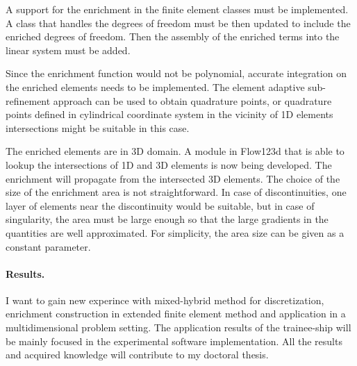 \documentclass{sna}
\begin{document}
A support for the enrichment in the finite element classes must be implemented. A class that handles the 
degrees of freedom must be then updated to include the enriched degrees of freedom. 
Then the assembly of the enriched terms into the linear system must be added.

Since the enrichment function would not be polynomial, accurate integration on the enriched elements needs to
be implemented. The element adaptive sub-refinement approach can be used to obtain quadrature points, 
or quadrature points defined in cylindrical coordinate system in the vicinity of 1D elements intersections
might be suitable in this case.

The enriched elements are in 3D domain. A module in Flow123d that is able to lookup the intersections
of 1D and 3D elements is now being developed. The enrichment will propagate from the intersected 3D elements.
The choice of the size of the enrichment area is not straightforward. In case of discontinuities, one layer of elements
near the discontinuity would be suitable, but in case of singularity, the area must be large enough so that 
the large gradients in the quantities are well approximated. For simplicity, the area size can be given as
a constant parameter.



\paragraph{Results.}
I want to gain new experince with mixed-hybrid method for discretization, 
enrichment construction in extended finite element method and application in a multidimensional problem setting.
The application results of the trainee-ship will be mainly focused in the experimental software implementation.
All the results and acquired knowledge will contribute to my doctoral thesis.
\end{document}
